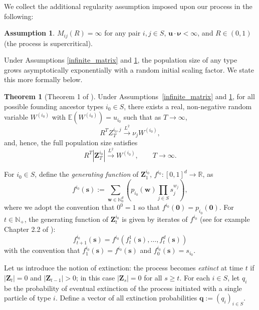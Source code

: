 \documentclass[preprint,3p,12pt]{elsarticle}
\theoremstyle{definition}
\newtheorem{assumption}{Assumption}
\newtheorem{theorem}{Theorem}
\begin{document}
We collect the additional regularity assumption imposed upon our process in the following:
\begin{assumption}\label{R-positive}
  $M_{ij}(R) = \infty$ for any pair $i,j \in S$, $\boldsymbol{u} \cdot\boldsymbol{\nu} < \infty$, and $R \in (0, 1)$ (the process is supercritical).
\end{assumption}
Under Assumptions \ref{infinite_matrix} and \ref{R-positive}, the population size of any type grows asymptotically exponentially with a random initial scaling factor. We state this more formally below.
\begin{theorem}[Theorem 1 of \cite{moy1967}] \label{moy}
Under Assumptions~\ref{infinite_matrix} and \ref{R-positive}, for all possible founding ancestor types $i_0 \in S$, there exists a real, non-negative random variable $W^{(i_0)}$ with $\mathbb{E}(W^{(i_0)}) = u_{i_0}$ such that as $T \rightarrow \infty$,
\begin{equation*}
    R^T Z_T^{i_0,j} \xrightarrow{L^2} \nu_j W^{(i_0)},
\end{equation*}
and, hence, the full population size satisfies
\begin{equation*}
   R^T |\boldsymbol{Z}_T^{i_0}| \xrightarrow{L^2} W^{(i_0)}, \qquad T \to \infty.
\end{equation*}
\end{theorem}
For $i_0 \in S$, define the \emph{generating function} of $\boldsymbol{Z}_1^{i_0}$, $f^{i_0}: [0,1]^{d} \rightarrow \mathbb{R}$, as
\begin{equation*}
    f^{i_0}(\boldsymbol{s}) := \sum_{\boldsymbol{w}\in \mathbb{N}_0^{d}}\left( p_{i_0}(\boldsymbol{w}) \prod_{j \in S}s_j^{w_j}\right),
\end{equation*}
where we adopt the convention that $0^0=1$ so that $f^{i_0}(\boldsymbol{0})=p_{i_0}(\boldsymbol{0})$. For $t \in \mathbb{N}_+$, the generating function of $\boldsymbol{Z}_t^{i_0}$ is given by iterates of $f^{i_0}$ (see for example Chapter 2.2 of \cite{harris1963}):
\begin{equation*}
    f^{i_0}_{t+1}(\boldsymbol{s}) = f^{i_0}(f_t^1(\boldsymbol{s}), \dots, f_t^d(\boldsymbol{s}))
\end{equation*}
with the convention that $f_1^{i_0}(\boldsymbol{s}) = f^{i_0}(\boldsymbol{s})$ and $f_0^{i_0}(\boldsymbol{s}) = s_{i_0}$. 

    Let us introduce the notion of extinction: the process becomes \emph{extinct} at time $t$ if $|\boldsymbol{Z}_t|=0$ and $|\boldsymbol{Z}_{t-1}|>0$; in this case $|\boldsymbol{Z}_s|=0$ for all $s \geq t$. For each $i \in S$, let $q_i$ be the probability of eventual extinction of the process initiated with a single particle of type $i$. Define a vector of all extinction probabilities $\boldsymbol{q}:= (q_i)_{i \in S}$.
\end{document}
